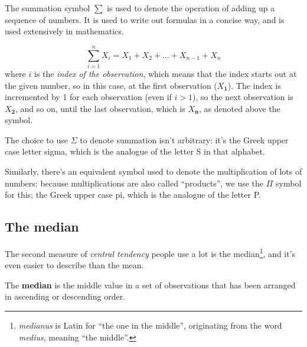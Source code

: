 \documentclass[
  11pt,
  a4paper,
  twoside,symmetric,openright]{book}
\theoremstyle{break}
\theoremstyle{break}
\begin{document}
\label{summation}
\begin{callout}

\begin{keepTogether}
The summation symbol \(\scriptstyle\sum\) is used to denote the operation of adding up a sequence of numbers. It is used to write out formulas in a concise way, and is used extensively in mathematics.

\[
\sum_{i=1}^n X_i = X_1 + X_2 + ... + X_{n-1} + X_n
\]
where \(i\) is the \emph{index of the observation}, which means that the index starts out at the given number, so in this case, at the first observation (\(X_\mathbf{1}\)). The index is incremented by 1 for each observation (even if \(i>1\)), so the next observation is \(X_\mathbf{2}\), and so on, until the last observation, which is \(X_\mathbf{n}\), as denoted above the symbol.

\end{keepTogether}

The choice to use \(\Sigma\) to denote summation isn't arbitrary: it's the Greek upper case letter sigma, which is the analogue of the letter S in that alphabet.

Similarly, there's an equivalent symbol used to denote the multiplication of lots of numbers: because multiplications are also called ``products'', we use the \(\Pi\) symbol for this; the Greek upper case pi, which is the analogue of the letter P.

\end{callout}

\subsection{The median}\label{median}

The second measure of \emph{central tendency} people use a lot is the median\footnote{\emph{medianus} is Latin for ``the one in the middle'', originating from the word \emph{medius}, meaning ``the middle''.}, and it's even easier to describe than the mean.

\begin{definition}[Median]
\protect\hypertarget{def:defmedian}{}\label{def:defmedian}The \textbf{median} is the middle value in a set of observations that has been arranged in ascending or descending order.
\end{definition}
\end{document}
